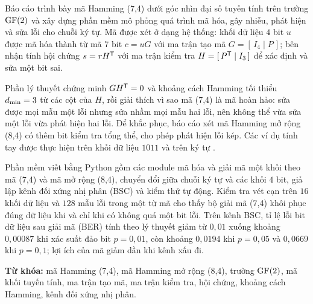 
Báo cáo trình bày mã Hamming (7,4) dưới góc nhìn đại số tuyến tính trên trường
$\mathrm{GF}(2)$ và xây dựng phần mềm mô phỏng quá trình mã hóa, gây nhiễu, phát hiện và
sửa lỗi cho chuỗi ký tự. Mã được xét ở dạng hệ thống: khối dữ liệu $4$ bit $u$
được mã hóa thành từ mã $7$ bit $c = uG$ với ma trận tạo mã
$G = [\,I_4 \mid P\,]$; bên nhận tính hội chứng $s = rH^{\mathsf{T}}$ với ma trận kiểm tra
$H = [\,P^{\mathsf{T}} \mid I_3\,]$ để xác định và sửa một bit sai.

Phần lý thuyết chứng minh $GH^{\mathsf{T}} = 0$ và khoảng cách Hamming tối thiểu
$d_{\min} = 3$ từ các cột của $H$, rồi giải thích vì sao mã (7,4) là mã hoàn hảo:
sửa được mọi mẫu một lỗi nhưng sửa nhầm mọi mẫu hai lỗi, nên không thể vừa sửa
một lỗi vừa phát hiện hai lỗi. Để khắc phục, báo cáo xét mã Hamming mở rộng
(8,4) có thêm bit kiểm tra tổng thể, cho phép phát hiện lỗi kép. Các ví dụ tính
tay được thực hiện trên khối dữ liệu $1011$ và trên ký tự .

Phần mềm viết bằng Python gồm các module mã hóa và giải mã một khối theo mã
(7,4) và mã mở rộng (8,4), chuyển đổi
giữa chuỗi ký tự và các khối $4$ bit, giả lập kênh đối xứng nhị phân (BSC) và
kiểm thử tự động. Kiểm tra vét cạn trên $16$ khối dữ liệu và $128$ mẫu lỗi trong
một từ mã cho thấy bộ giải mã (7,4) khôi phục đúng dữ liệu khi và chỉ khi có
không quá một bit lỗi. Trên kênh BSC, tỉ lệ lỗi bit dữ liệu sau giải mã (BER)
tính theo lý thuyết giảm từ $0{,}01$ xuống khoảng $0{,}00087$ khi xác suất đảo
bit $p = 0{,}01$, còn khoảng $0{,}0194$ khi $p = 0{,}05$ và $0{,}0669$ khi
$p = 0{,}1$; lợi ích của mã giảm dần khi kênh xấu đi.

\vspace{0.5em}
\noindent\textbf{Từ khóa:} mã Hamming (7,4), mã Hamming mở rộng (8,4), trường
$\mathrm{GF}(2)$, mã khối tuyến tính, ma trận tạo mã, ma trận kiểm tra, hội chứng, khoảng
cách Hamming, kênh đối xứng nhị phân.
